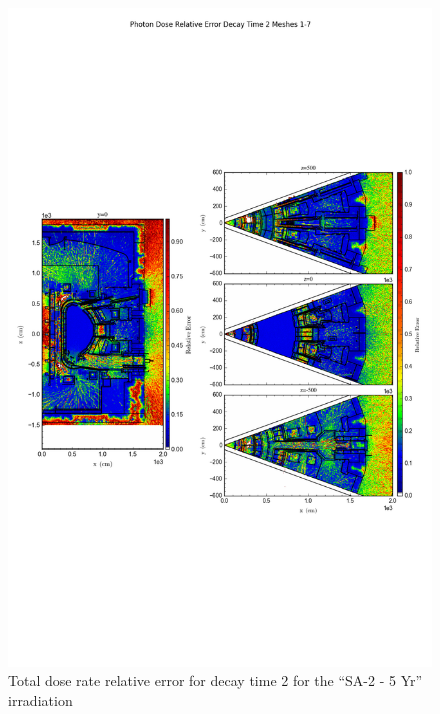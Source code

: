\documentclass[12pt]{article}
\begin{document}
\begin{figure}[ht!]
\centering
\includegraphics[trim={0cm 8cm, 0cm 8cm},clip,scale=0.75]{../plots/final_model/10year/Photon_Dose_Relative_Error_Decay_Time_2_Meshes_1-7.png}
\caption{Total dose rate relative error for decay time 2 for the ``SA-2 - 5 Yr'' irradiation}
\label{fig:photons_10y_dc2_nob4c_relerr}
\end{figure}
\end{document}
